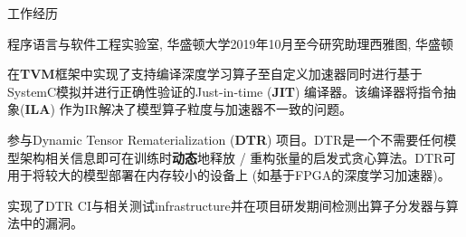 \documentclass{resume}
\begin{document}
	\begin{rSection}{工作经历}



		\begin{rSubsection}{程序语言与软件工程实验室, 华盛顿大学}{2019年10月至今}{研究助理}{西雅图, 华盛顿} 
			\item 在\textbf{TVM}框架中实现了支持编译深度学习算子至自定义加速器同时进行基于SystemC模拟并进行正确性验证的Just-in-time (\textbf{JIT}) 编译器。该编译器将指令抽象(\textbf{ILA}) 作为IR解决了模型算子粒度与加速器不一致的问题。
			\item 参与Dynamic Tensor Rematerialization (\textbf{DTR}) 项目。DTR是一个不需要任何模型架构相关信息即可在训练时\textbf{动态}地释放 / 重构张量的启发式贪心算法。DTR可用于将较大的模型部署在内存较小的设备上 (如基于FPGA的深度学习加速器)。
			\item 实现了DTR CI与相关测试infrastructure并在项目研发期间检测出算子分发器与算法中的漏洞。
		\end{rSubsection}


\end{rSection}
\end{document}

